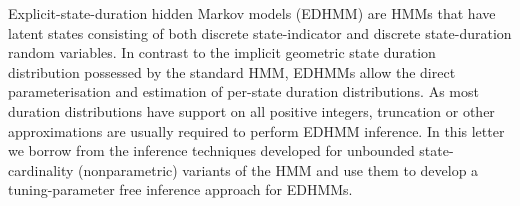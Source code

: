 Explicit-state-duration hidden Markov models (EDHMM) are HMMs that have latent states consisting of both discrete state-indicator and discrete state-duration random variables.  In contrast to the implicit geometric state duration distribution possessed by the standard HMM, EDHMMs allow the direct parameterisation and estimation of per-state duration distributions. As most duration distributions have support on all positive integers, truncation or other approximations are usually required to perform EDHMM inference.  In this letter we borrow from the inference techniques developed for unbounded state-cardinality (nonparametric) variants of the HMM and use them to develop a tuning-parameter free inference approach for EDHMMs.  %